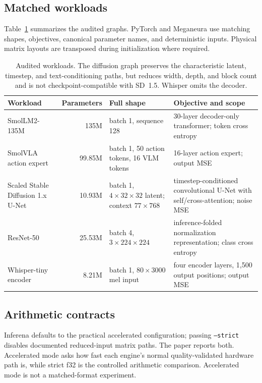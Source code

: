 \documentclass[10pt,twocolumn]{article}
\newcommand{\system}{Meganeura}
\newcommand{\inferena}{Inferena}
\newcommand{\code}[1]{\texttt{#1}}
\begin{document}
\subsection{Matched workloads}

Table~\ref{tab:workloads} summarizes the audited graphs. PyTorch and
\system{} use matching shapes, objectives, canonical parameter names, and
deterministic inputs. Physical matrix layouts are transposed during
initialization where required.

\begin{table}[t]
\centering
\small
\begin{tabularx}{\textwidth}{l r X X}
\toprule
Workload & Parameters & Full shape & Objective and scope \\
\midrule
SmolLM2-135M & 135M &
batch 1, sequence 128 &
30-layer decoder-only transformer; token cross entropy \\
SmolVLA action expert~\cite{shukor2025smolvla} & 99.85M &
batch 1, 50 action tokens, 16 VLM tokens &
16-layer action expert; output MSE \\
Scaled Stable Diffusion 1.x U-Net~\cite{rombach2022ldm} & 10.93M &
batch 1, $4\times32\times32$ latent; context $77\times768$ &
timestep-conditioned convolutional U-Net with self/cross-attention; noise MSE \\
ResNet-50~\cite{he2016resnet} & 25.53M &
batch 4, $3\times224\times224$ &
inference-folded normalization representation; class cross entropy \\
Whisper-tiny encoder~\cite{radford2022whisper} & 8.21M &
batch 1, $80\times3000$ mel input &
four encoder layers, 1,500 output positions; output MSE \\
\bottomrule
\end{tabularx}
\caption{Audited workloads. The diffusion graph preserves the characteristic
latent, timestep, and text-conditioning paths, but reduces width, depth, and
block count and is not checkpoint-compatible with SD~1.5. Whisper omits the
decoder.}
\label{tab:workloads}
\end{table}

\subsection{Arithmetic contracts}
\label{sec:precision}

\inferena{} defaults to the practical accelerated configuration; passing
\code{--strict} disables documented reduced-input matrix paths. The paper
reports both. Accelerated mode asks how fast each engine's normal
quality-validated hardware path is, while strict f32 is the controlled
arithmetic comparison. Accelerated mode is not a matched-format experiment.
\end{document}
